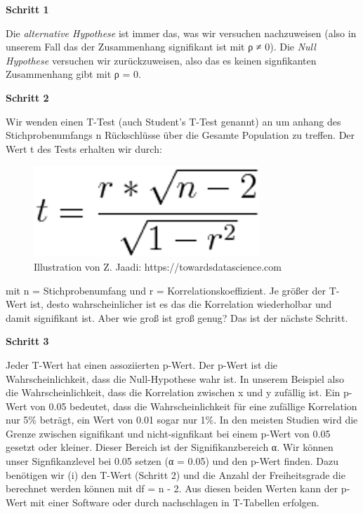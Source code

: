 \documentclass[
]{article}
\begin{document}
\textbf{Schritt 1}

Die \emph{alternative Hypothese} ist immer das, was wir versuchen nachzuweisen (also in unserem Fall das der Zusammenhang signifikant ist mit ρ ≠ 0). Die \emph{Null Hypothese} versuchen wir zurückzuweisen, also das es keinen signfikanten Zusammenhang gibt mit ρ = 0.

\textbf{Schritt 2}

Wir wenden einen T-Test (auch Student's T-Test genannt) an um anhang des Stichprobenumfangs n Rückschlüsse über die Gesamte Population zu treffen. Der Wert t des Tests erhalten wir durch:

\begin{figure}

{\centering \includegraphics[width=1\linewidth]{images/059} 

}

\caption{Illustration von Z. Jaadi: https://towardsdatascience.com}\label{fig:unnamed-chunk-269}
\end{figure}

mit n = Stichprobenumfang und r = Korrelationskoeffizient. Je größer der T-Wert ist, desto wahrscheinlicher ist es das die Korrelation wiederholbar und damit signifikant ist. Aber wie groß ist groß genug? Das ist der nächste Schritt.

\textbf{Schritt 3}

Jeder T-Wert hat einen assoziierten p-Wert. Der p-Wert ist die Wahrscheinlichkeit, dass die Null-Hypothese wahr ist. In unserem Beispiel also die Wahrscheinlichkeit, dass die Korrelation zwischen x und y zufällig ist. Ein p-Wert von 0.05 bedeutet, dass die Wahrscheinlichkeit für eine zufällige Korrelation nur 5\% beträgt, ein Wert von 0.01 sogar nur 1\%. In den meisten Studien wird die Grenze zwischen signifikant und nicht-signfikant bei einem p-Wert von 0.05 gesetzt oder kleiner. Dieser Bereich ist der Signifikanzbereich α. Wir können unser Signfikanzlevel bei 0.05 setzen (α = 0.05) und den p-Wert finden. Dazu benötigen wir (i) den T-Wert (Schritt 2) und die Anzahl der Freiheitsgrade die berechnet werden können mit df = n - 2. Aus diesen beiden Werten kann der p-Wert mit einer Software oder durch nachschlagen in T-Tabellen erfolgen.
\end{document}
